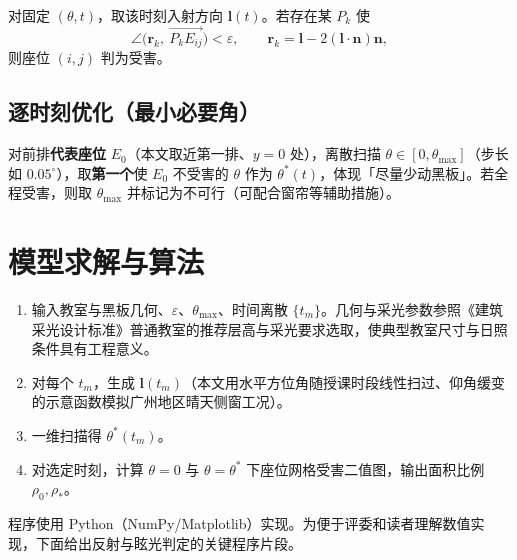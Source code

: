 \documentclass[UTF8,a4paper,12pt]{ctexart}
\begin{document}
对固定 $(\theta,t)$，取该时刻入射方向 $\mathbf{l}(t)$。若存在某 $P_k$ 使
\begin{equation}
  \angle\big(\mathbf{r}_k,\ \overrightarrow{P_kE_{ij}}\big)<\varepsilon,\qquad
  \mathbf{r}_k=\mathbf{l}-2(\mathbf{l}\cdot\mathbf{n})\mathbf{n},
\end{equation}
则座位 $(i,j)$ 判为受害。

\subsection{逐时刻优化（最小必要角）}
对前排\textbf{代表座位} $E_0$（本文取近第一排、$y=0$ 处），离散扫描 $\theta\in[0,\theta_{\max}]$（步长如 $0.05^\circ$），取\textbf{第一个}使 $E_0$ 不受害的 $\theta$ 作为 $\theta^\ast(t)$，体现「尽量少动黑板」。若全程受害，则取 $\theta_{\max}$ 并标记为不可行（可配合窗帘等辅助措施）。

\section{模型求解与算法}
\begin{enumerate}
  \item 输入教室与黑板几何、$\varepsilon$、$\theta_{\max}$、时间离散 $\{t_m\}$。几何与采光参数参照《建筑采光设计标准》普通教室的推荐层高与采光要求选取，使典型教室尺寸与日照条件具有工程意义。
  \item 对每个 $t_m$，生成 $\mathbf{l}(t_m)$（本文用水平方位角随授课时段线性扫过、仰角缓变的示意函数模拟广州地区晴天侧窗工况）。
  \item 一维扫描得 $\theta^\ast(t_m)$。
  \item 对选定时刻，计算 $\theta=0$ 与 $\theta=\theta^\ast$ 下座位网格受害二值图，输出面积比例 $\rho_0,\rho_\ast$。
\end{enumerate}

程序使用 Python（NumPy/Matplotlib）实现。为便于评委和读者理解数值实现，下面给出反射与眩光判定的关键程序片段。

\end{document}
